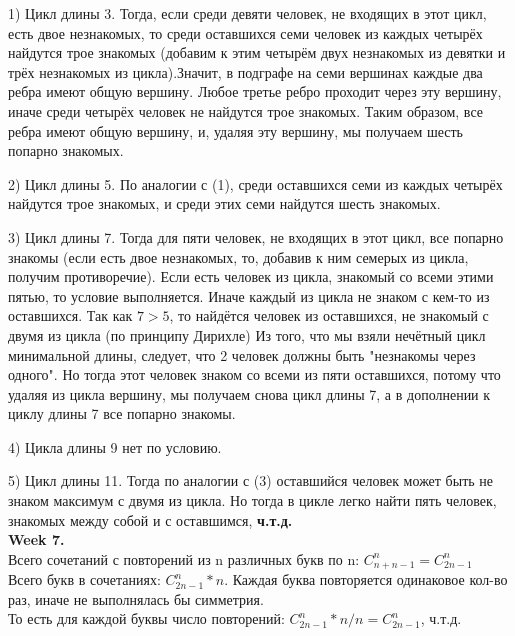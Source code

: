 \documentclass[a4paper,12pt]{article}
\begin{document}
  1) Цикл длины 3. Тогда, если среди девяти человек, не входящих в этот цикл, есть двое незнакомых, то среди оставшихся семи человек из каждых четырёх найдутся трое знакомых (добавим к этим четырём двух незнакомых из девятки и трёх незнакомых из цикла).Значит, в подграфе на семи вершинах каждые два ребра имеют общую вершину. Любое третье ребро проходит через эту вершину, иначе среди четырёх человек не найдутся трое знакомых. Таким образом, все ребра имеют общую вершину, и, удаляя эту вершину, мы получаем шесть попарно знакомых.

  2) Цикл длины 5. По аналогии с (1), среди оставшихся семи из каждых четырёх найдутся трое знакомых, и среди этих семи найдутся шесть знакомых.

  3) Цикл длины 7. Тогда для пяти человек, не входящих в этот цикл, все попарно знакомы (если есть двое незнакомых, то, добавив к ним семерых из цикла, получим противоречие). Если есть человек из цикла, знакомый со всеми этими пятью, то условие выполняется. Иначе каждый из цикла не знаком с кем-то из оставшихся. Так как  $ 7 > 5 $,  то найдётся человек из оставшихся, не знакомый с двумя из цикла (по принципу Дирихле)
  Из того, что мы взяли нечётный цикл минимальной длины, следует, что 2 человек должны быть "незнакомы через одного".
  Но тогда этот человек знаком со всеми из пяти оставшихся, потому что удаляя из цикла вершину, мы получаем снова цикл длины 7, а в дополнении к циклу длины 7 все попарно знакомы.

 4) Цикла длины 9 нет по условию.

  5) Цикл длины 11. Тогда по аналогии с (3) оставшийся человек может быть не знаком максимум с двумя из цикла. Но тогда в цикле легко найти пять человек, знакомых между собой и с оставшимся, \textbf{ч.т.д.}
\\

\textbf{Week 7.}
\\

Всего сочетаний с повторений из n различных букв по n: $ C_{n+n-1}^n = C_{2n-1}^n $
\\
Всего букв в сочетаниях: $ C_{2n-1}^n * n $. Каждая буква повторяется одинаковое кол-во раз, иначе не выполнялась бы симметрия. 
\\
То есть для каждой буквы число повторений: $ C_{2n-1}^n * n / n = C_{2n-1}^n $, ч.т.д.  
\end{document}
